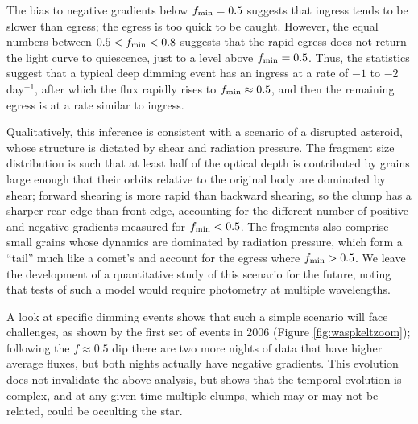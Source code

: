 \documentclass[]{rsos}
\begin{document}
The bias to negative gradients below $f_{\rm min}=0.5$ suggests that ingress tends to be
slower than egress; the egress is too quick to be caught. However, the equal numbers
between $0.5 < f_{\rm min} < 0.8$ suggests that the rapid egress does not return the
light curve to quiescence, just to a level above $f_{\rm min}=0.5$. Thus, the statistics
suggest that a typical deep dimming event has an ingress at a rate of $-1$ to $-2$
day$^{-1}$, after which the flux rapidly rises to $f_{\rm min} \approx 0.5$, and then the
remaining egress is at a rate similar to ingress.

Qualitatively, this inference is consistent with a scenario of a disrupted asteroid,
whose structure is dictated by shear and radiation pressure. The fragment size
distribution is such that at least half of the optical depth is contributed by grains
large enough that their orbits relative to the original body are dominated by shear;
forward shearing is more rapid than backward shearing, so the clump has a sharper rear
edge than front edge, accounting for the different number of positive and negative
gradients measured for $f_{\rm min} < 0.5$. The fragments also comprise small grains
whose dynamics are dominated by radiation pressure, which form a ``tail'' much like a
comet's and account for the egress where $f_{\rm min} > 0.5$. We leave the development of
a quantitative study of this scenario for the future, noting that tests of such a model
would require photometry at multiple wavelengths.

A look at specific dimming events shows that such a simple scenario will face challenges,
as shown by the first set of events in 2006 (Figure \ref{fig:waspkeltzoom}); following
the $f \approx 0.5$ dip there are two more nights of data that have higher average
fluxes, but both nights actually have negative gradients. This evolution does not
invalidate the above analysis, but shows that the temporal evolution is complex, and at
any given time multiple clumps, which may or may not be related, could be occulting the
star.
\end{document}
